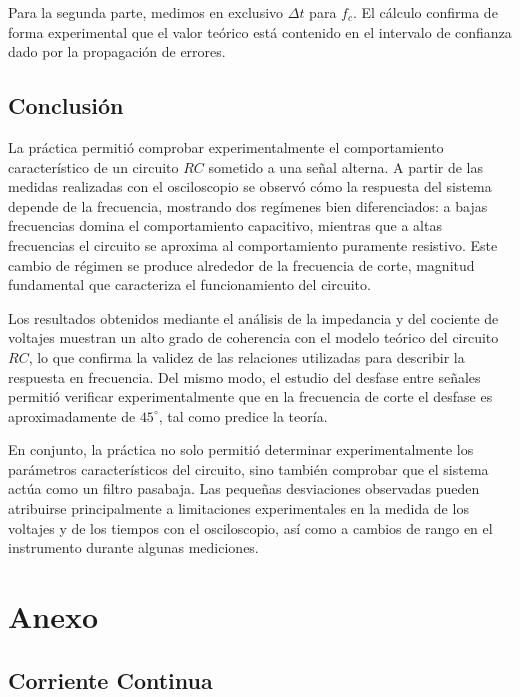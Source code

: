 \documentclass[11pt]{report}
\begin{document}
\begin{refsection}
Para la segunda parte, medimos en exclusivo $\Delta t$ para $f_c$. El cálculo confirma de forma experimental que el valor teórico está
contenido en el intervalo de confianza dado por la propagación de errores.

\section{\textbf{Conclusión}}

La práctica permitió comprobar experimentalmente el comportamiento característico de un circuito $RC$ sometido a una señal alterna.
A partir de las medidas realizadas con el osciloscopio se observó cómo la respuesta del sistema depende de la frecuencia,
mostrando dos regímenes bien diferenciados: a bajas frecuencias domina el comportamiento capacitivo, mientras que a altas
frecuencias el circuito se aproxima al comportamiento puramente resistivo. Este cambio de régimen se produce alrededor de la
frecuencia de corte, magnitud fundamental que caracteriza el funcionamiento del circuito.

Los resultados obtenidos mediante el análisis de la impedancia y del cociente de voltajes muestran un alto grado de coherencia con el
modelo teórico del circuito $RC$, lo que confirma la validez de las relaciones utilizadas para describir la respuesta en frecuencia.
Del mismo modo, el estudio del desfase entre señales permitió verificar experimentalmente que en la frecuencia de corte el desfase es aproximadamente
de $45^\circ$, tal como predice la teoría.

En conjunto, la práctica no solo permitió determinar experimentalmente los parámetros característicos del circuito, sino también comprobar
que el sistema actúa como un filtro pasabaja. Las pequeñas desviaciones observadas pueden atribuirse principalmente a limitaciones
experimentales en la medida de los voltajes y de los tiempos con el osciloscopio, así como a cambios de rango en el instrumento durante algunas mediciones.

\nocite{*}
\printbibliography[keyword={parteB},title={\textbf{Bibliografía}},heading=subbibnumbered]
\end{refsection}

\newpage
\chapter{Anexo}
\section{Corriente Continua}
\end{document}
